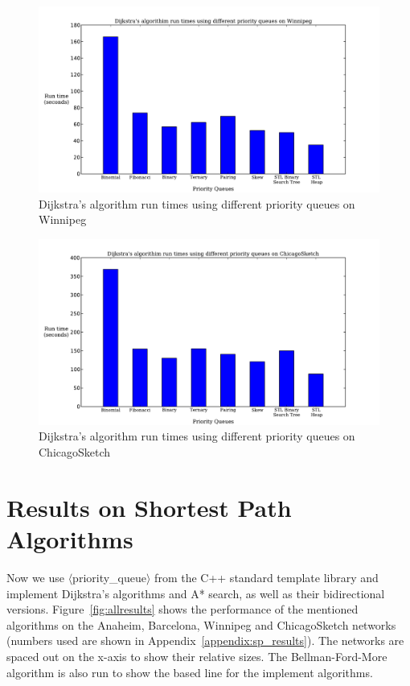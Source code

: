 \begin{figure}[H]
    \centering
    \includegraphics[width=\textwidth, height=.4\textheight]{img/pq_runtime2}
    \caption{Dijkstra's algorithm run times using different priority queues on Winnipeg}
    \label{fig:pq_runtime2}
\end{figure}
\begin{figure}[H]
    \centering
    \includegraphics[width=\textwidth, height=.4\textheight]{img/pq_runtime}
    \caption{Dijkstra's algorithm run times using different priority queues on ChicagoSketch}
    \label{fig:pq_runtime}
\end{figure}

\section{Results on Shortest Path Algorithms}
Now we use $\langle$priority\_queue$\rangle$ from the C++ standard template library and implement Dijkstra's algorithms and A* search, as well as their bidirectional versions.
Figure~\ref{fig:allresults} shows the performance of the mentioned algorithms on the Anaheim, Barcelona, Winnipeg and ChicagoSketch networks
(numbers used are shown in Appendix~\ref{appendix:sp_results}).
The networks are spaced out on the x-axis to show their relative sizes.
The Bellman-Ford-More algorithm is also run to show the based line for the implement algorithms.


